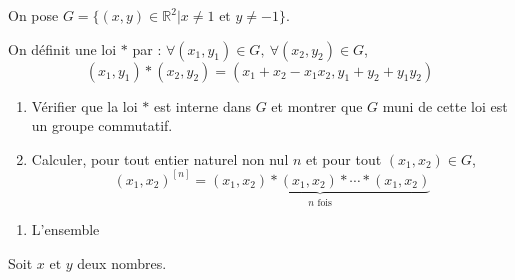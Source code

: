 \begin{exercise}[from=Devoir SR MPI 2010]
	On pose $G=\{(x,y)\in \mathbb{R}^2 \vert  x\neq 1 \text{ et } y \neq -1\}$.

    On définit une loi $*$ par : $\forall (x_1, y_1) \in G,\ \forall (x_2,y_2) \in G$,
    \begin{equation*}
        (x_1, y_1)*(x_2,y_2)=(x_1+x_2-x_1x_2, y_1+y_2+y_1y_2)
    \end{equation*}
    \begin{enumerate}
        \item Vérifier que la loi $*$ est interne dans $G$ et montrer que $G$ muni de cette loi est un groupe commutatif.
        \item Calculer, pour tout entier naturel non nul $n$ et pour tout $(x_1,x_2) \in G$,
        \begin{equation*}
            (x_1,x_2)^{[n]}=\underbrace{(x_1,x_2)*(x_1,x_2)*\cdots * (x_1,x_2)}_{n \text{ fois}}
        \end{equation*}
    \end{enumerate}

    \cor
    \begin{enumerate}
        \item L'ensemble
    \end{enumerate}

    Soit $x \text{ et } y$ deux nombres.
\end{exercise}

\begin{exercise}
	\lipsum[2-5]
	\tcblower
	\lipsum[3]
\end{exercise}
\begin{exercise}[from=Devoir SN MPI 2018]
	\lipsum[2-5]
	\tcblower
	\lipsum[3]
\end{exercise}
\begin{exercise}[nosol,from=Concours Asecna 2015]
	\lipsum[6]
\end{exercise}
\begin{exercise}
	\lipsum[2-5]
	\tcblower
	\lipsum[3-10]
\end{exercise}

\begin{exercise}[nosol]
	\lipsum[6]
\end{exercise}
\begin{exercise}
	\lipsum[2-5]
	\tcblower
	\lipsum[3]
\end{exercise}
\begin{exercise}[from=TD SB 2015]
	\lipsum[2-5]
	\tcblower
	\lipsum[3]
\end{exercise}
\begin{exercise}[nosol]
	\lipsum[6]
\end{exercise}
\begin{exercise}
	\lipsum[2-5]
	\tcblower
	\lipsum[3]
\end{exercise}

